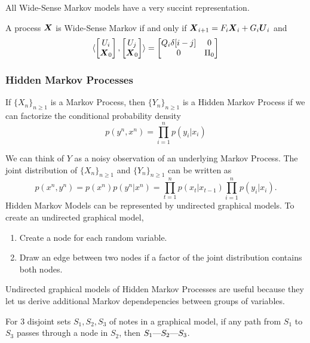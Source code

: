 All Wide-Sense Markov models have a very succint representation.
\begin{theorem}
	A process $\boldsymbol{X}$ is Wide-Sense Markov if and only if $\boldsymbol{X}_{i+1} = F_i \boldsymbol{X}_i + G_i \boldsymbol{U}_i$ and \[
		\langle \begin{bmatrix} U_i \\ \boldsymbol{X}_0 \end{bmatrix}, \begin{bmatrix} U_j \\ \boldsymbol{X}_0 \end{bmatrix} \rangle = \begin{bmatrix} Q_i \delta[i-j] & 0\\
			0 & \Pi_0
		\end{bmatrix}
	\]
	\label{thm:ws-markov}
\end{theorem}
\subsubsection{Hidden Markov Processes}
\begin{definition}
	If $\{X_n\}_{n\geq1}$ is a Markov Process, then $\{Y_n\}_{n\geq1}$ is a Hidden Markov Process if we can factorize the conditional probability density
	\[
		p(y^n, x^n) = \prod_{i=1}^np(y_i|x_i)
	\]
	\label{defn:hidden-markov-process}
\end{definition}
We can think of $Y$ as a noisy observation of an underlying Markov Process.
The joint distribution of $\{X_n\}_{n\geq1}$ and $\{Y_n\}_{n\geq1}$ can be written as \[
	p(x^n, y^n) = p(x^n)p(y^n|x^n) = \prod_{t=1}^np(x_t|x_{t-1})\prod_{i=1}^np(y_i|x_i).
\]
Hidden Markov Models can be represented by undirected graphical models.
To create an undirected graphical model,
\begin{enumerate}
	\item Create a node for each random variable.
	\item Draw an edge between two nodes if a factor of the joint distribution contains both nodes.
\end{enumerate}
Undirected graphical models of Hidden Markov Processes are useful because they let us derive additional Markov dependepencies between groups of variables.
\begin{theorem}
	For 3 disjoint sets $S_1, S_2, S_3$ of notes in a graphical model, if any path from $S_1$ to $S_3$ passes through a node in $S_2$, then $S_1\text{\textemdash}S_2\text{\textemdash}S_3$.
	\label{thm:graphic-triplet}
\end{theorem}
